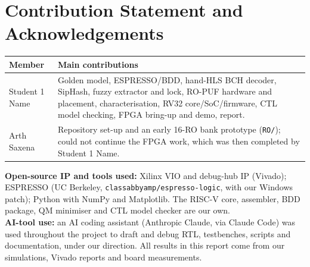 \documentclass[11pt,a4paper]{article}
\newcommand{\studentA}{Student 1 Name}            %
\newcommand{\studentB}{Arth Saxena}               %
\begin{document}
\section*{Contribution Statement and Acknowledgements}
\label{sec:contrib}
\begin{table}[H]\centering\small
\begin{tabularx}{\linewidth}{@{}lX@{}}
\toprule
Member & Main contributions\\
\midrule
\studentA & Golden model, ESPRESSO/BDD, hand-HLS BCH decoder, SipHash, fuzzy extractor and lock, RO-PUF
hardware and placement, characterisation, RV32 core/SoC/firmware, CTL model checking, FPGA bring-up and
demo, report.\\
\studentB & Repository set-up and an early 16-RO bank prototype (\texttt{RO/}); could not continue the
FPGA work, which was then completed by \studentA.\\
\bottomrule
\end{tabularx}
\end{table}

\textbf{Open-source IP and tools used:} Xilinx VIO and debug-hub IP (Vivado); ESPRESSO (UC Berkeley,
\texttt{classabbyamp/espresso-logic}, with our Windows patch); Python with NumPy and Matplotlib. The RISC-V
core, assembler, BDD package, QM minimiser and CTL model checker are our own.\\
\textbf{AI-tool use:} an AI coding assistant (Anthropic Claude, via Claude Code) was used throughout the
project to draft and debug RTL, testbenches, scripts and documentation, under our direction. All results
in this report come from our simulations, Vivado reports and board measurements.
\end{document}
